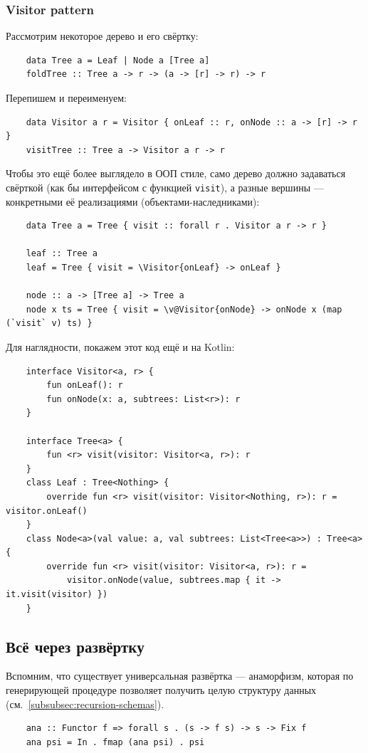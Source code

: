 \subsubsection{Visitor pattern} \label{subsubsec:visitor}

Рассмотрим некоторое дерево и его свёртку:
\begin{verbatim}
    data Tree a = Leaf | Node a [Tree a]
    foldTree :: Tree a -> r -> (a -> [r] -> r) -> r
\end{verbatim}

Перепишем и переименуем:
\begin{verbatim}
    data Visitor a r = Visitor { onLeaf :: r, onNode :: a -> [r] -> r }
    visitTree :: Tree a -> Visitor a r -> r
\end{verbatim}

Чтобы это ещё более выглядело в ООП стиле, само дерево должно задаваться свёрткой (как бы интерфейсом с функцией \texttt{visit}), а разные вершины --- конкретными её реализациями (объектами-наследниками):
\begin{verbatim}
    data Tree a = Tree { visit :: forall r . Visitor a r -> r }

    leaf :: Tree a
    leaf = Tree { visit = \Visitor{onLeaf} -> onLeaf }

    node :: a -> [Tree a] -> Tree a
    node x ts = Tree { visit = \v@Visitor{onNode} -> onNode x (map (`visit` v) ts) }
\end{verbatim}

Для наглядности, покажем этот код ещё и на Kotlin:
\begin{verbatim}
    interface Visitor<a, r> {
        fun onLeaf(): r
        fun onNode(x: a, subtrees: List<r>): r
    }

    interface Tree<a> {
        fun <r> visit(visitor: Visitor<a, r>): r
    }
    class Leaf : Tree<Nothing> {
        override fun <r> visit(visitor: Visitor<Nothing, r>): r = visitor.onLeaf()
    }
    class Node<a>(val value: a, val subtrees: List<Tree<a>>) : Tree<a> {
        override fun <r> visit(visitor: Visitor<a, r>): r =
            visitor.onNode(value, subtrees.map { it -> it.visit(visitor) })
    }
\end{verbatim}

\subsection{Всё через развёртку} \label{subsec:all-unfolds}

Вспомним, что существует универсальная развёртка --- анаморфизм, которая по генерирующей процедуре позволяет получить целую структуру данных (см.~\ref{subsubsec:recursion-schemas}).
\begin{verbatim}
    ana :: Functor f => forall s . (s -> f s) -> s -> Fix f
    ana psi = In . fmap (ana psi) . psi
\end{verbatim}

